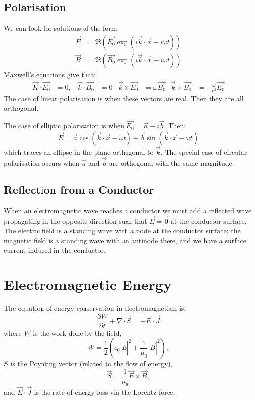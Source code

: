 \documentclass[../Main.tex]{subfiles}
\begin{document}
\subsection{Polarisation}
We can look for solutions of the form:
\begin{align*}
    \vec{E} &= \Re(\vec{E_0} \exp(i\vec{k} \cdot \vec{x} - i\omega t)) \\
    \vec{B} &= \Re(\vec{B_0} \exp(i\vec{k} \cdot \vec{x} - i\omega t))
\end{align*}
Maxwell's equations give that:
\begin{align*}
    \vec{K} \cdot \vec{E_0} &= 0, & \vec{k} \cdot \vec{B_0} &= 0 & \vec{k} \times \vec{E_0} &= \omega \vec{B_0} & \vec{k} \times \vec{B_0} &= -\frac{\omega}{c^2} \vec{E_0}
\end{align*}
The case of linear polarisation is when these vectors are real. Then they are all orthogonal.

The case of elliptic polarisation is when $\vec{E_0} = \vec{a} - i\vec{b}$. Then:
\begin{equation*}
    \vec{E} = \vec{a} \cos(\vec{k} \cdot \vec{x} - \omega t) + \vec{b} \sin(\vec{k} \cdot \vec{x} - \omega t)
\end{equation*}
which traces an ellipse in the plane orthogonal to $\vec{k}$. The special case of circular polarisation occurs when $\vec{a}$ and $\vec{b}$ are orthogonal with the same magnitude.
\subsection{Reflection from a Conductor}
When an electromagnetic wave reaches a conductor we must add a reflected wave propagating in the opposite direction such that $\vec{E} = \vec0$ at the conductor surface. The electric field is a standing wave with a node at the conductor surface; the magnetic field is a standing wave with an antinode there, and we have a surface current induced in the conductor.
\section{Electromagnetic Energy}
The equation of energy conservation in electromagnetism is:
\begin{equation*}
    \frac{\partial W}{\partial t} + \nabla \cdot \vec{S} = -\vec{E} \cdot \vec{J}
\end{equation*}
where $W$ is the work done by the field,
\begin{equation*}
    W = \frac12 \left(\epsilon_0 |\vec{E}|^2 + \frac{1}{\mu_0} |\vec{B}|^2\right),
\end{equation*}
$S$ is the Poynting vector (related to the flow of energy),
\begin{equation*}
    \vec{S} = \frac{1}{\mu_0} \vec{E} \times \vec{B},
\end{equation*}
and $\vec{E} \cdot \vec{J}$ is the rate of energy loss via the Lorentz force.
\end{document}
